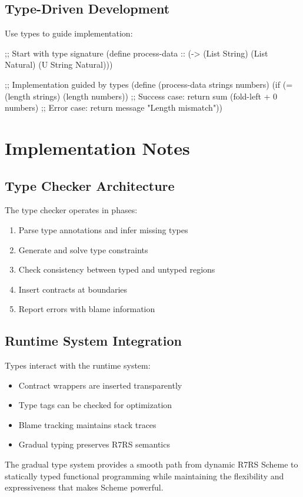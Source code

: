 \subsection{Type-Driven Development}
\label{subsec:type-driven}

Use types to guide implementation:

\begin{example}
\begin{lambdustcode}
;; Start with type signature
(define process-data :: (-> (List String) (List Natural) (U String Natural)))

;; Implementation guided by types
(define (process-data strings numbers)
  (if (= (length strings) (length numbers))
      ;; Success case: return sum  
      (fold-left + 0 numbers)
      ;; Error case: return message
      "Length mismatch"))
\end{lambdustcode}
\end{example}

\section{Implementation Notes}
\label{sec:gradual-implementation}

\subsection{Type Checker Architecture}
\label{subsec:checker-architecture}

The type checker operates in phases:
\begin{enumerate}
\item Parse type annotations and infer missing types
\item Generate and solve type constraints  
\item Check consistency between typed and untyped regions
\item Insert contracts at boundaries
\item Report errors with blame information
\end{enumerate}

\subsection{Runtime System Integration}
\label{subsec:runtime-integration}

Types interact with the runtime system:
\begin{itemize}
\item Contract wrappers are inserted transparently
\item Type tags can be checked for optimization
\item Blame tracking maintains stack traces
\item Gradual typing preserves R7RS semantics
\end{itemize}

The gradual type system provides a smooth path from dynamic R7RS Scheme to statically typed functional programming while maintaining the flexibility and expressiveness that makes Scheme powerful.